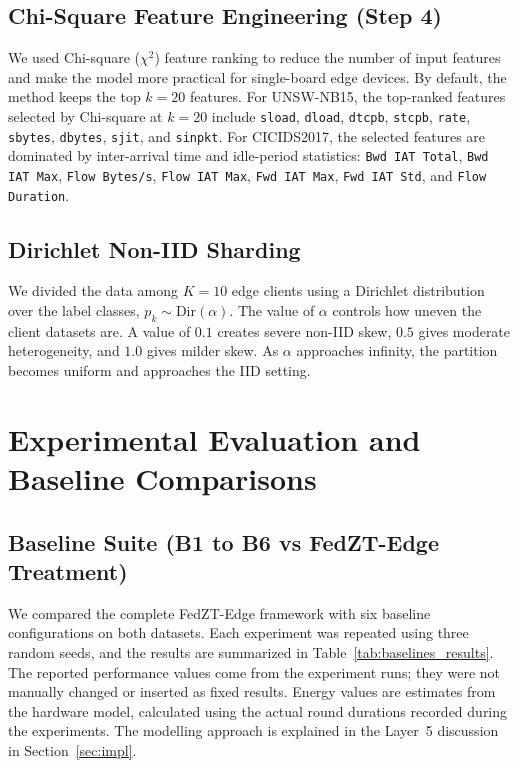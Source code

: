 \documentclass[11pt,a4paper]{article}
\newcommand{\bigsection}[1]{\FloatBarrier\Needspace*{0.22\textheight}\section{#1}}
\begin{document}
\subsection{Chi-Square Feature Engineering (Step 4)}
We used Chi-square ($\chi^2$) feature ranking to reduce the number of input features and make the model more practical for single-board edge devices. By default, the method keeps the top $k=20$ features. For UNSW-NB15, the top-ranked features selected by Chi-square at $k=20$ include \texttt{sload}, \texttt{dload}, \texttt{dtcpb}, \texttt{stcpb}, \texttt{rate}, \texttt{sbytes}, \texttt{dbytes}, \texttt{sjit}, and \texttt{sinpkt}. For CICIDS2017, the selected features are dominated by inter-arrival time and idle-period statistics: \texttt{Bwd IAT Total}, \texttt{Bwd IAT Max}, \texttt{Flow Bytes/s}, \texttt{Flow IAT Max}, \texttt{Fwd IAT Max}, \texttt{Fwd IAT Std}, and \texttt{Flow Duration}.

\subsection{Dirichlet Non-IID Sharding}
We divided the data among $K=10$ edge clients using a Dirichlet distribution over the label classes, $p_{k} \sim \mathrm{Dir}(\alpha)$. The value of $\alpha$ controls how uneven the client datasets are. A value of $0.1$ creates severe non-IID skew, $0.5$ gives moderate heterogeneity, and $1.0$ gives milder skew. As $\alpha$ approaches infinity, the partition becomes uniform and approaches the IID setting.

\bigsection{Experimental Evaluation and Baseline Comparisons}\label{sec:eval}

\subsection{Baseline Suite (B1 to B6 vs FedZT-Edge Treatment)}
We compared the complete FedZT-Edge framework with six baseline configurations on both datasets. Each experiment was repeated using three random seeds, and the results are summarized in Table~\ref{tab:baselines_results}. The reported performance values come from the experiment runs; they were not manually changed or inserted as fixed results. Energy values are estimates from the hardware model, calculated using the actual round durations recorded during the experiments. The modelling approach is explained in the Layer~5 discussion in Section~\ref{sec:impl}.
\end{document}
